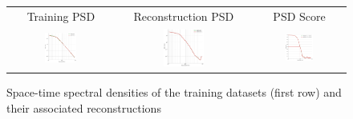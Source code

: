 \begin{figure}[h!]
\small
\begin{center}
\setlength{\tabcolsep}{1pt}
\begin{tabular}{ccc}

\hspace{3mm} Training PSD & 
\hspace{3mm} Reconstruction PSD & 
\hspace{3mm} PSD Score  \\


\includegraphics[width=0.32\textwidth]{figures/plots/isotrop_psd_tide_train.png} &
\includegraphics[width=0.32\textwidth]{figures/plots/isotrop_psd_tide_rec.png} &
\includegraphics[width=0.32\textwidth]{figures/plots/tide_1d_psd_score.png}


\end{tabular}
\vspace{-3mm}
\caption{
Space-time spectral densities of the training datasets (first row) and their associated reconstructions}\vspace{-5mm}
\label{fig:res1}
\end{center}
\end{figure}
